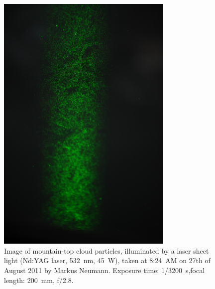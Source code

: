 \documentclass[../main.tex]{subfiles}
\begin{document}
\begin{figure}
\centering
\noindent \includegraphics[width=20pc]{gfx/imaging_example_1617.jpg}
\caption{Image of mountain-top cloud particles, illuminated by a laser sheet light (Nd:YAG laser, 532~nm, 45~W), taken at 8:24~AM on 27th of August 2011 by Markus Neumann. Exposure time: 1/3200~s,focal length: 200~mm, f/2.8.}
\label{fig:ch2_08}
\end{figure}
\end{document}
